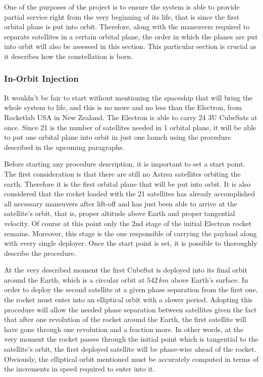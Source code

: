 One of the purposes of the project is to ensure the system is able to provide partial service right from the very beginning of its life, that is since the first orbital plane is put into orbit. Therefore, along with the maneuvers required to separate satellites in a certain orbital plane, the order in which the planes are put into orbit will also be assessed in this section. This particular section is crucial as it describes how the constellation is born.

\subsubsection{In-Orbit Injection}
It wouldn't be fair to start without mentioning the spaceship that will bring the whole system to life, and this is no more and no less than the Electron, from Rocketlab USA in New Zealand. The Electron is able to carry 24 3U CubeSats at once. Since 21 is the number of satellites needed in 1 orbital plane, it will be able to put one orbital plane into orbit in just one launch using the procedure described in the upcoming paragraphs.

Before starting any procedure description, it is important to set a start point. The first consideration is that there are still no Astrea satellites orbiting the earth. Therefore it is the first orbital plane that will be put into orbit. It is also considered that the rocket loaded with the 21 satellites has already accomplished all necessary maneuvers after lift-off and has just been able to arrive at the satellite's orbit, that is, proper altitude above Earth and proper tangential velocity. Of course at this point only the 2nd stage of the initial Electron rocket remains. Moreover, this stage is the one responsible of carrying the payload along with every single deployer. Once the start point is set, it is possible to thoroughly describe the procedure.

At the very described moment the first CubeSat is deployed into its final orbit around the Earth, which is a circular orbit at $542 \,km$ above Earth's surface. In order to deploy the second satellite at a given phase separation from the first one, the rocket must enter into an elliptical orbit with a slower period. Adopting this procedure will allow the needed phase separation between satellites given the fact that after one revolution of the rocket around the Earth, the first satellite will have gone through one revolution and a fraction more. In other words, at the very moment the rocket passes through the initial point which is tangential to the satellite's orbit, the first deployed satellite will be phase-wise ahead of the rocket. Obviously, the elliptical orbit mentioned must be accurately computed in terms of the increments in speed required to enter into it.

